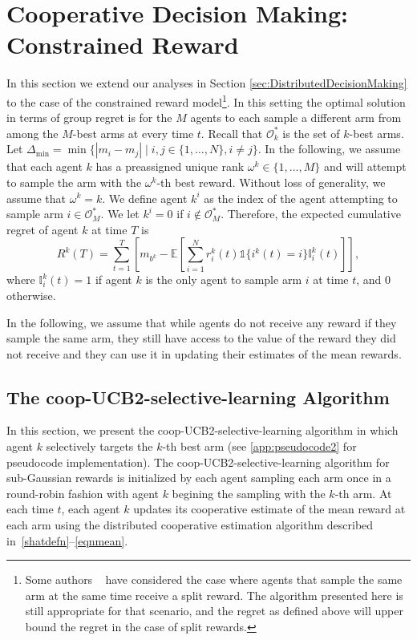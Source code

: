 \documentclass[final,5p,times,twocolumn]{elsarticle}
\theoremstyle{definition}
\def \mc {\mathcal}
\newcommand{\until}[1]{\{1,\dots, #1\}}
\newcommand{\setdef}[2]{\{#1 \; | \; #2\}}
\begin{document}
\section{Cooperative Decision Making: Constrained Reward
}\label{sec:Coop-ucb2-collisions}
In this section we extend our analyses in Section \ref{sec:DistributedDecisionMaking} to the case of the constrained reward model\footnote{Some authors  ~\cite{anandkumar2011distributed,kalathil2014decentralized} have considered the case where agents that sample the same arm at the same time receive a split reward.  The algorithm presented here is still appropriate for that scenario, and the regret as defined above will upper bound the regret in the case of split rewards.}.  In this setting the optimal solution in terms of group regret is for the $M$ agents to each sample a different arm from among the $M$-best arms at every time $t$.  Recall that $\mathcal{O}_{k}^*$ is the set of $k$-best arms. Let $\Delta_{\min} = \min \setdef{|m_i-m_j|}{i, j \in \until{N}, i \ne j}$. In the following, we assume that each agent $k$  has a preassigned unique rank $\omega^k \in \until{M}$ and will attempt to sample the arm with the $\omega^k$-th best reward.  Without loss of generality, we assume that $\omega^k =k$. We  define agent $k^i$ {as the index of} the agent attempting to sample arm $i \in \mc O^*_M$.  We let $k^i = 0$ if $i \notin \mc O^*_M$. 
Therefore, the expected cumulative regret of agent $k$ at time $T$ is
\begin{equation} \label{eqn:RegretDefnCol}
	R^k(T) = \sum_{t=1}^T \left [  m_{b^k}- \mathbb{E} \left [ \sum_{i=1}^N r_i^k(t) \mathds{1}\{i^k(t) = i\} \mathbb{I}_{i}^k(t) \right ] \right ],
\end{equation}
where $\mathbb{I}_{i}^k(t) = 1$ if agent $k$ is the only agent to sample arm $i$ at time $t$, and $0$ otherwise.  

In the following, we assume that while agents do not receive any reward if they sample the same arm, they still have access to the {value of the} reward they did not receive and they can use it in updating their estimates of the mean rewards.

\subsection{The coop-UCB2-selective-learning Algorithm}
In this section, we present the coop-UCB2-selective-learning algorithm in which agent $k$ selectively targets the $k$-th best arm (see \ref{app:pseudocode2} for pseudocode implementation).  The coop-UCB2-selective-learning algorithm for sub-Gaussian rewards is initialized by each agent sampling each arm once in a round-robin fashion with agent $k$ begining the sampling with the $k$-th arm. At each time $t$, each agent $k$ updates its cooperative estimate of the mean reward at each arm using the distributed cooperative estimation algorithm described in~\eqref{shatdefn}--\eqref{eqnmean}. 
\end{document}
